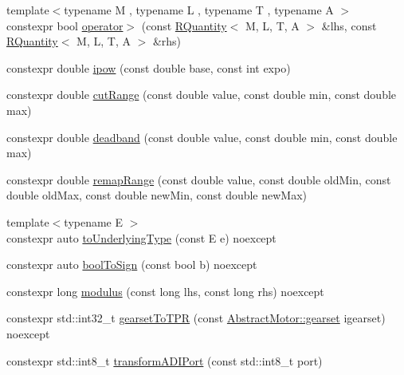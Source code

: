 \begin{DoxyCompactItemize}
\item 
{\footnotesize template$<$typename M , typename L , typename T , typename A $>$ }\\constexpr bool \mbox{\hyperlink{namespaceokapi_a6fa2a8add20e9524b5f46e98645c98f4}{operator$>$}} (const \mbox{\hyperlink{classokapi_1_1RQuantity}{R\+Quantity}}$<$ M, L, T, A $>$ \&lhs, const \mbox{\hyperlink{classokapi_1_1RQuantity}{R\+Quantity}}$<$ M, L, T, A $>$ \&rhs)
\item 
constexpr double \mbox{\hyperlink{namespaceokapi_aba6bd8fdde45445ead2bd8c3bf887fb4}{ipow}} (const double base, const int expo)
\item 
constexpr double \mbox{\hyperlink{namespaceokapi_a9addecfa5e4788ced786601de724be03}{cut\+Range}} (const double value, const double min, const double max)
\item 
constexpr double \mbox{\hyperlink{namespaceokapi_a3e4d3d6ba218365ec624a70840134039}{deadband}} (const double value, const double min, const double max)
\item 
constexpr double \mbox{\hyperlink{namespaceokapi_aa3f2ac5be19e6749d986489c69968605}{remap\+Range}} (const double value, const double old\+Min, const double old\+Max, const double new\+Min, const double new\+Max)
\item 
{\footnotesize template$<$typename E $>$ }\\constexpr auto \mbox{\hyperlink{namespaceokapi_a458b2538f443eedc4e601b2f8a9acf03}{to\+Underlying\+Type}} (const E e) noexcept
\item 
constexpr auto \mbox{\hyperlink{namespaceokapi_a8b21920388594f5d7da116069741deb4}{bool\+To\+Sign}} (const bool b) noexcept
\item 
constexpr long \mbox{\hyperlink{namespaceokapi_a32aac326b5e0f0ba82bb5dea50852504}{modulus}} (const long lhs, const long rhs) noexcept
\item 
constexpr std\+::int32\+\_\+t \mbox{\hyperlink{namespaceokapi_a771e911293fb57115a4085904bd83663}{gearset\+To\+T\+PR}} (const \mbox{\hyperlink{classokapi_1_1AbstractMotor_a88aaa6ea2fa10f5520a537bbf26774d5}{Abstract\+Motor\+::gearset}} igearset) noexcept
\item 
constexpr std\+::int8\+\_\+t \mbox{\hyperlink{namespaceokapi_a9a07f99442516f34af3c1f22e26f75b8}{transform\+A\+D\+I\+Port}} (const std\+::int8\+\_\+t port)
\end{DoxyCompactItemize}
